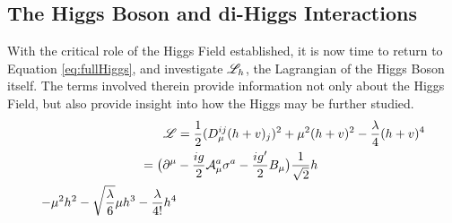 


        
    \subsection{The Higgs Boson and di-Higgs Interactions}

        With the critical role of the Higgs Field established, it is now time to return to Equation \ref{eq:fullHiggs},
            and investigate $\mathscr{L}_h$, the Lagrangian of the Higgs Boson itself.
        The terms involved therein provide information not only about the Higgs Field,
            but also provide insight into how the Higgs may be further studied.
        \begin{equation} \begin{split}
            \mathscr{L} & = \frac{1}{2} (D_{\mu}^{ij} (h+v)_j)^2
                + \mu^2 (h+v)^2
                - \frac{\lambda}{4} (h+v)^4 \\
            = \big( \partial^{\mu} & - \frac{ig}{2} \mathcal{A}^a_{\mu} \sigma^a - \frac{ig'}{2} B_{\mu} \big) \frac{1}{\sqrt{2}}h \\
                - \mu^2 h^2
                -\sqrt{\frac{\lambda}{6}} \mu h^3
                - \frac{\lambda}{4!} h^4 \\
        \end{split} \end{equation}


        
        
